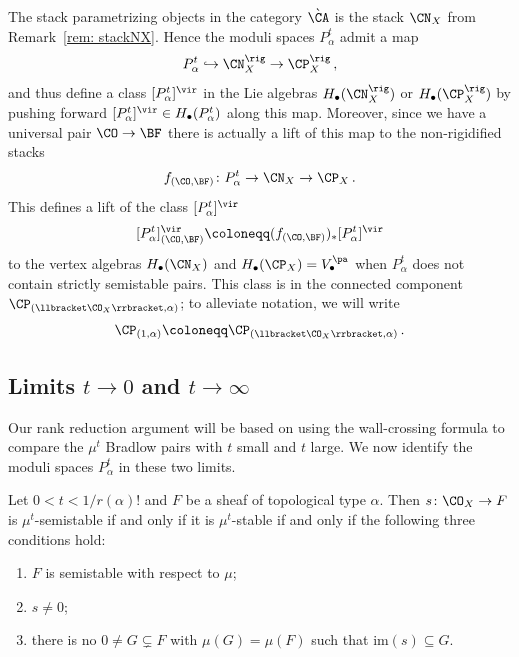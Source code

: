 The stack parametrizing objects in the category $\grave \CA$ is the stack $\CN_X$ from Remark~\ref{rem: stackNX}. Hence the moduli spaces $P_\alpha^t$ admit a map
\[P_\alpha^t\hookrightarrow \CN_X^\rig\rightarrow \CP_X^\rig\,,\]
and thus define a class $[P_\alpha^t]^\vir$ in the Lie algebras $H_\bullet(\CN_X^\rig)$ or $ H_\bullet(\CP_X^\rig)$ by pushing forward $[P_\alpha^t]^\vir\in H_\bullet(P_\alpha^t)$ along this map. Moreover, since we have a universal pair $\CO\to\BF$ there is actually a lift of this map to the non-rigidified stacks
\[f_{(\CO,\BF)}\colon P_\alpha^t\to \CN_X \rightarrow \CP_X\,.\]
This defines a lift of the class $[P_\alpha^t]^\vir$
\[[P_\alpha^t]^\vir_{(\CO,\BF)}\coloneqq (f_{(\CO,\BF)})_\ast [P_\alpha^t]^\vir\]
to the vertex algebras $H_\bullet(\CN_X)$ and $ H_\bullet(\CP_X)=V_\bullet^{\pa}$ when $P_\alpha^t$ does not contain strictly semistable pairs. This class is in the connected component $\CP_{(\llbracket \CO_X\rrbracket, \alpha)}$; to alleviate notation, we will write
\[\CP_{(1, \alpha)}\coloneqq \CP_{(\llbracket \CO_X\rrbracket, \alpha)}\,.\]

\subsection{Limits $t\rightarrow 0$ and $t\to \infty$}
\label{sec: limits}
Our rank reduction argument will be based on using the wall-crossing formula to compare the $\mu^t$ Bradlow pairs with $t$ small and $t$ large. We now identify the moduli spaces $P_\alpha^t$ in these two limits.

\begin{proposition}[{\cite[Theorem 8.13, Ex. 5.6]{Jo21}}]
\notready

\label{prop: limitt0}
Let $0<t<1/r(\alpha)!$ and $F$ be a sheaf of topological type $\alpha$. Then  $s\colon \CO_X\to F$ is $\mu^{t}$-semistable if and only if it is $\mu^{t}$-stable if and only if the following three conditions hold:
\begin{enumerate}
    \item $F$ is semistable with respect to $\mu$;
    \item $s\neq 0$;
    \item there is no $0\neq G\subsetneq F$ with $\mu(G)=\mu(F)$ such that $\mathrm{im}(s)\subseteq G$.
\end{enumerate}
\end{proposition}

